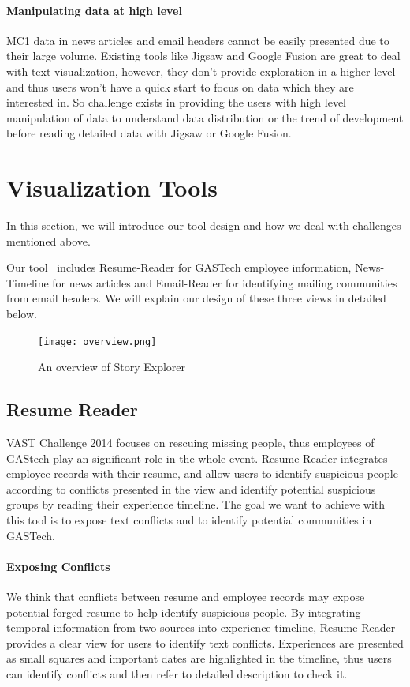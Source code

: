 \documentclass{vgtc}                          %
\begin{document}
\paragraph{Manipulating data at high level}
MC1 data in news articles and email headers cannot be easily presented due to their large volume. Existing tools like Jigsaw and Google Fusion are great to deal with text visualization, however, they don't provide exploration in a higher level and thus users won't have a quick start to focus on data which they are interested in. So challenge exists in providing the users with high level manipulation of data to understand data distribution or the trend of development before reading detailed data with Jigsaw or Google Fusion.

\section{Visualization Tools}
In this section, we will introduce our tool design and how we deal with challenges mentioned above.
\par
Our tool \projectname\ includes Resume-Reader for GASTech employee information, News-Timeline for news articles and Email-Reader for identifying mailing communities from email headers. We will explain our design of these three views in detailed below.
\begin{figure}[htb!]
  \centering
  \texttt{[image: overview.png]}
  \caption{An overview of Story Explorer}
\end{figure}
\subsection{Resume Reader}
VAST Challenge 2014 focuses on rescuing missing people, thus employees of GAStech play an significant role in the whole event. Resume Reader integrates employee records with their resume, and allow users to identify suspicious people according to conflicts presented in the view and identify potential suspicious groups by reading their experience timeline. The goal we want to achieve with this tool is to expose text conflicts and to identify potential communities in GASTech.
\paragraph{Exposing Conflicts}
We think that conflicts between resume and employee records may expose potential forged resume to help identify suspicious people. By integrating temporal information from two sources into experience timeline, Resume Reader provides a clear view for users to identify text conflicts. Experiences are presented as small squares and important dates are highlighted in the timeline, thus users can identify conflicts and then refer to detailed description to check it.
\end{document}
